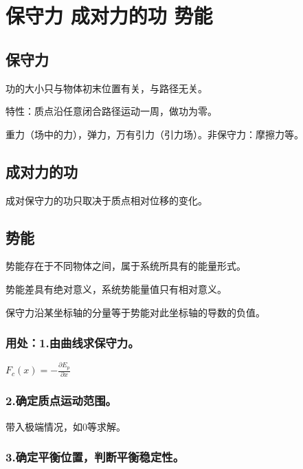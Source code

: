 
	\section{ 保守力 成对力的功 势能}
	
	\subsection{保守力}
	
\begin{definition}[保守力]
	功的大小只与物体初末位置有关，与路径无关。\
\end{definition}
	特性：质点沿任意闭合路径运动一周，做功为零。
	
	 
		\begin{example}
			重力（场中的力），弹力，万有引力（引力场）。非保守力：摩擦力等。
		\end{example}
	
	\subsection{成对力的功}
	
	成对保守力的功只取决于质点相对位移的变化。
	
	\subsection{势能}
	
	势能存在于不同物体之间，属于系统所具有的能量形式。
	
	势能差具有绝对意义，系统势能量值只有相对意义。
	
\begin{definition}[势能曲线]
	保守力沿某坐标轴的分量等于势能对此坐标轴的导数的负值。
\end{definition}
	
	
\subsubsection{用处：1.由曲线求保守力。}
	$F_{c}(x)=-\frac{\partial E_{p}}{\partial x}$
	\subsubsection{2.确定质点运动范围。}
	{ 带入极端情况，如0等求解。}
	\subsubsection{3.确定平衡位置，判断平衡稳定性。}
	

